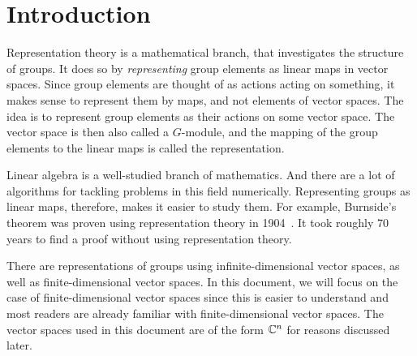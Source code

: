 \section{Introduction}

Representation theory is a mathematical branch, that investigates the structure of groups.
It does so by \textit{representing} group elements as linear maps in vector spaces.
Since group elements are thought of as actions acting on something, it makes sense to represent them by maps, and not elements of vector spaces.
The idea is to represent group elements as their actions on some vector space.
The vector space is then also called a $G$-module, and the mapping of the group elements to the linear maps is called the representation.

Linear algebra is a well-studied branch of mathematics.
And there are a lot of algorithms for tackling problems in this field numerically.
Representing groups as linear maps, therefore, makes it easier to study them.
For example, Burnside's theorem was proven using representation theory in 1904~\cite{burnside1904groups}.
It took roughly 70 years to find a proof without using representation theory.


There are representations of groups using infinite-dimensional vector spaces, as well as finite-dimensional vector spaces.
In this document, we will focus on the case of finite-dimensional vector spaces since this is easier to understand and most readers are already familiar with finite-dimensional vector spaces.
The vector spaces used in this document are of the form $\mathbb{C}^n$ for reasons discussed later.
